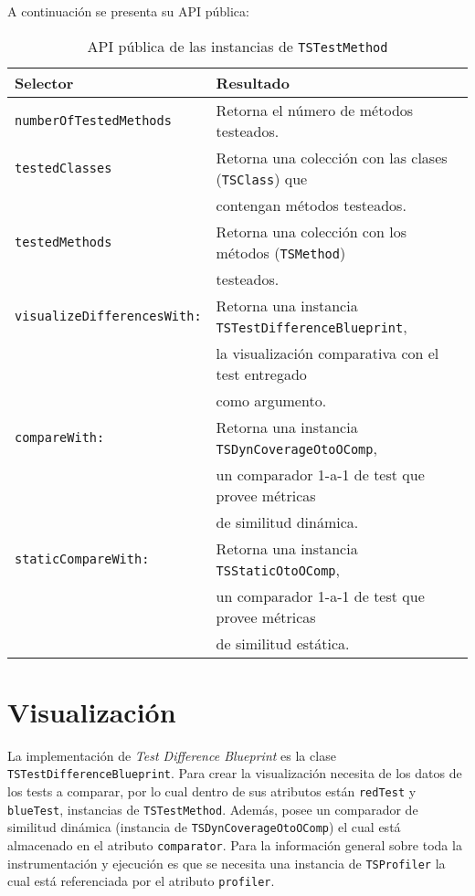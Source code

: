 \par A continuación se presenta su API pública: 

\begin{table}[h] 
    \centering 
    \begin{tabular}{|l|l|}
    	\hline
\textbf{Selector} & \textbf{Resultado} \\ \hline \hline

{\tt numberOfTestedMethods } & Retorna el número de métodos testeados.\\ \hline
{\tt testedClasses} & Retorna una colección con las clases ({\tt TSClass}) que \\ 
						& contengan métodos testeados.\\ \hline
{\tt testedMethods}	& Retorna una colección con los métodos ({\tt TSMethod}) \\
						& testeados. \\ \hline
{\tt visualizeDifferencesWith:} & Retorna una instancia {\tt TSTestDifferenceBlueprint},\\
						&  la visualización comparativa con el test entregado\\
						&  como argumento. \\ \hline
{\tt compareWith:} & Retorna una instancia {\tt TSDynCoverageOtoOComp}, \\  
						&  un comparador 1-a-1  de test que provee métricas \\
						&  de similitud dinámica.\\ \hline		
{\tt staticCompareWith:} & Retorna una instancia {\tt TSStaticOtoOComp},  \\ 
						& un comparador 1-a-1 de test que provee métricas \\
						& de similitud estática.\\ \hline						
    \end{tabular}
    \caption{API pública de las instancias de {\tt TSTestMethod}}
\end{table} 



\section{Visualización}
\par La implementación de \emph{Test Difference Blueprint} es la clase {\tt TSTestDifferenceBlueprint}. Para crear la visualización necesita de los datos de los tests a comparar, por lo cual dentro de sus atributos están {\tt redTest} y {\tt blueTest}, instancias de {\tt TSTestMethod}. Además, posee un comparador de similitud dinámica (instancia de {\tt TSDynCoverageOtoOComp}) el cual está almacenado en el atributo {\tt comparator}. Para la información general sobre toda la instrumentación y ejecución es que se necesita una instancia de {\tt TSProfiler} la cual está referenciada por el atributo {\tt profiler}. 

